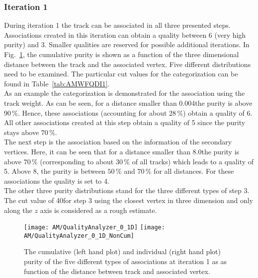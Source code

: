 

\subsubsection{Iteration 1}
During iteration 1 the track can be associated in all three presented steps. Associations created in this iteration can obtain a quality between 6 (very high purity) and 3. Smaller qualities are reserved for possible additional iterations. In Fig.~\ref{plot:AMWFQualityI1}, the cumulative purity is shown as a function of the three dimensional distance between the track and the associated vertex. Five different distributions need to be examined. The particular cut values for the categorization can be found in Table~\ref{tab:AMWFQDI1}. \\
As an example the categorization is demonstrated for the association using the track weight. As can be seen, for a distance smaller than 0.004\cm the purity is above $90\,\%$. Hence, these associations (accounting for about $28\,\%$) obtain a quality of 6. All other associations created at this step obtain a quality of 5 since the purity stays above $70\,\%$. \\
The next step is the association based on the information of the secondary vertices. Here, it can be seen that for a distance smaller than 8.0\cm the purity is above $70\,\%$ (corresponding to about $30\,\%$ of all tracks) which leads to a quality of 5. Above 8\cm{}, the purity is between $50\,\%$ and $70\,\%$ for all distances. For these associations the quality is set to 4. \\
The other three purity distributions stand for the three different types of step 3. The cut value of 40\cm for step 3 using the closest vertex in three dimension and only along the $z$ axis is considered as a rough estimate.

\begin{figure}[!ht]
    \centering
    \texttt{[image: AM/QualityAnalyzer\_0\_1D]}
    \texttt{[image: AM/QualityAnalyzer\_0\_1D\_NonCum]}
    \caption[Cumulative and normal purity of iteration 1 \vs{} distance to define quality]{The cumulative (left hand plot) and individual (right hand plot) purity of the five different types of associations at iteration 1 as as function of the distance between track and associated vertex.\label{plot:AMWFQualityI1}}
\end{figure}



